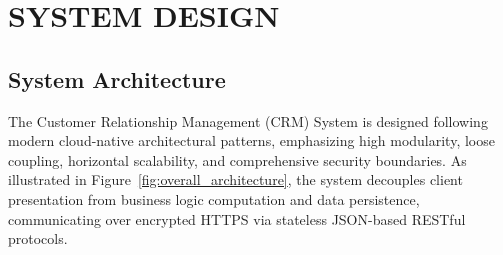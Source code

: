 \chapter{SYSTEM DESIGN}

\section{System Architecture}
The Customer Relationship Management (CRM) System is designed following modern cloud-native architectural patterns, emphasizing high modularity, loose coupling, horizontal scalability, and comprehensive security boundaries. As illustrated in Figure~\ref{fig:overall_architecture}, the system decouples client presentation from business logic computation and data persistence, communicating over encrypted HTTPS via stateless JSON-based RESTful protocols.

